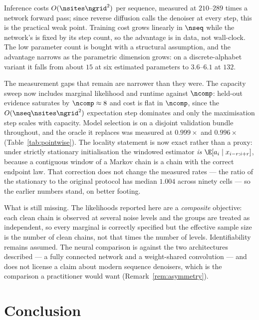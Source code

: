 \documentclass{article}
\begin{document}
Inference costs $O(\nsites\ngrid^2)$ per sequence, measured at $210$--$289$ times a network
forward pass; since reverse diffusion calls the denoiser at every step, this is the practical
weak point. Training cost grows linearly in $\nseq$ while the network's is fixed by its step
count, so the advantage is in data, not wall-clock. The low parameter count is bought with a
structural assumption, and the advantage narrows as the parametric dimension grows: on a
discrete-alphabet variant it falls from about $15$ at six estimated parameters to $3.6$--$6.1$
at $132$.

The measurement gaps that remain are narrower than they were. The capacity sweep now includes
marginal likelihood and runtime against $\ncomp$: held-out evidence saturates by $\ncomp\approx8$
and cost is flat in $\ncomp$, since the $O(\nseq\nsites\ngrid^{2})$ expectation step dominates and
only the maximisation step scales with capacity. Model selection is on a disjoint validation
bundle throughout, and the oracle it replaces was measured at $0.999\times$ and $0.996\times$
(Table~\ref{tab:pointwise}). The locality statement is now exact rather than a proxy: under
strictly stationary initialisation the windowed estimator \emph{is} $\E[a_i \mid x_{i-r:i+r}]$,
because a contiguous window of a Markov chain is a chain with the correct endpoint law. That
correction does not change the measured rates --- the ratio of the stationary to the original
protocol has median $1.004$ across ninety cells --- so the earlier numbers stand, on better
footing.

What is still missing. The likelihoods reported here are a \emph{composite} objective: each clean
chain is observed at several noise levels and the groups are treated as independent, so every
marginal is correctly specified but the effective sample size is the number of clean chains, not
that times the number of levels. Identifiability remains assumed. The neural comparison is
against the two architectures described --- a fully connected network and a weight-shared
convolution --- and does not license a claim about modern sequence denoisers, which is the
comparison a practitioner would want (Remark~\ref{rem:asymmetry}).

\section{Conclusion}
\end{document}
